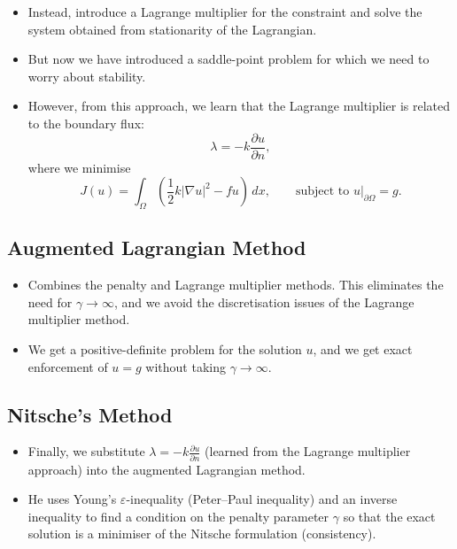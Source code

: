 \documentclass[11pt,a4paper]{article}
\begin{document}
\begin{itemize}
    \item Instead, introduce a Lagrange multiplier for the constraint and solve the system obtained from stationarity of the Lagrangian.

    \item But now we have introduced a saddle-point problem for which we need to worry about stability.

    \item However, from this approach, we learn that the Lagrange multiplier is related to the boundary flux:
    \[
        \lambda=-k\frac{\partial u}{\partial n},
    \]
    where we minimise
    \[
        J(u)=\int_\Omega\left(\frac12 k|\nabla u|^2-fu\right)\,dx,
        \qquad\text{subject to }u|_{\partial\Omega}=g.
    \]
\end{itemize}

\subsection{Augmented Lagrangian Method}

\begin{itemize}
    \item Combines the penalty and Lagrange multiplier methods. This eliminates the need for $\gamma\to\infty$, and we avoid the discretisation issues of the Lagrange multiplier method.

    \item We get a positive-definite problem for the solution $u$, and we get exact enforcement of $u=g$ without taking $\gamma\to\infty$.
\end{itemize}

\subsection{Nitsche's Method}

\begin{itemize}
    \item Finally, we substitute $\lambda=-k\frac{\partial u}{\partial n}$ (learned from the Lagrange multiplier approach) into the augmented Lagrangian method.

    \item He uses Young's $\varepsilon$-inequality (Peter--Paul inequality) and an inverse inequality to find a condition on the penalty parameter $\gamma$ so that the exact solution is a minimiser of the Nitsche formulation (consistency).
\end{itemize}
\end{document}
